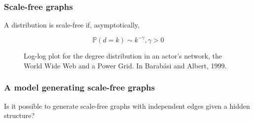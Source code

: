 \documentclass{beamer}
\newcommand{\proba}{\mathbb{P}}
\begin{document}
\begin{frame}
\frametitle{Scale-free graphs}

A distribution is scale-free if, asymptotically, 

$$\proba(d=k) \sim k^{-\gamma}, \gamma>0$$


\begin{figure}
\caption{Log-log plot for the degree distribution in an actor's network, the World Wide Web and a Power Grid. In Barab\'asi and Albert, 1999.}
\end{figure}

\end{frame}



\begin{frame}
\frametitle{A model generating scale-free graphs}

Is it possible to generate scale-free graphs with independent edges given a hidden structure?



\begin{figure}
\psfrag{scalefree}{$\proba(d_i=k)\sim k^{-\gamma}$}
\end{figure}

\end{frame}
\end{document}
